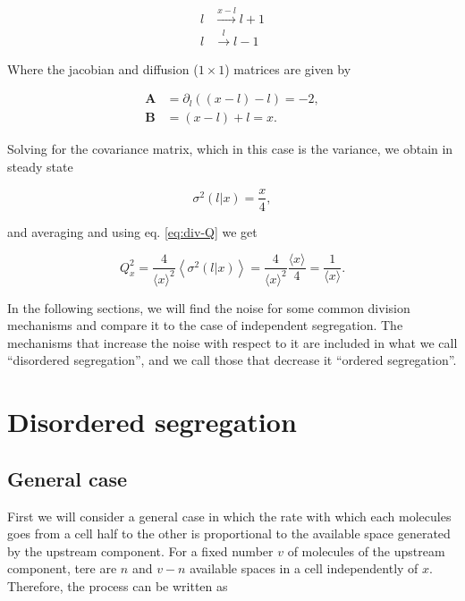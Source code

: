 \begin{equation}
  \label{eq:div-arr_ind}
  \begin{split}
    l&\xrightarrow{x-l}l+1\\
    l&\xrightarrow{l}l-1
  \end{split}
\end{equation}

Where the jacobian and diffusion ($1\times1$) matrices are given by

\begin{equation}
  \begin{split}
    \mathbf{A} &= \partial_l\left((x-l)-l\right) = -2,\\
    \mathbf{B} &= (x-l)+l = x.
  \end{split}
\end{equation}

Solving for the covariance matrix, which in this case is the variance, we obtain in steady state

\begin{equation}
  \label{eq:div-var_ind}
  \sigma^2(l|x) = \frac{x}{4},
\end{equation}

and averaging and using eq. \eqref{eq:div-Q} we get

\begin{equation}
  Q_x^2 = \frac{4}{\langle x\rangle^2}\left\langle\sigma^2(l|x)\right\rangle = \frac{4}{\langle x\rangle^2}\frac{\langle x\rangle}{4} = \frac{1}{\langle x\rangle}.
\end{equation}

In the following sections, we will find the noise for some common division mechanisms and compare it to the case of independent segregation. The mechanisms that increase the noise with respect to it are included in what we call ``disordered segregation'', and we call those that decrease it ``ordered segregation''.

\section{Disordered segregation}

\subsection{General case}

First we will consider a general case in which the rate with which each molecules goes from a cell half to the other is proportional to the available space generated by the upstream component. For a fixed number $v$ of molecules of the upstream component, tere are $n$ and $v-n$ available spaces in a cell independently of $x$. Therefore, the process can be written as

